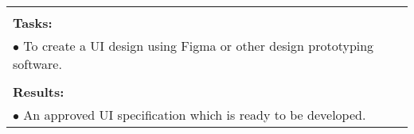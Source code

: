 \begin{table}[!h]
\begin{center}
\begin{tabular}{|p{}||p{}|p{}||p{}|}
            \multicolumn{4}{|p{.95\columnwidth}|}{}\\
            \multicolumn{4}{|p{.95\columnwidth}|}{\textbf{Tasks:}}\\
            \multicolumn{4}{|p{.95\columnwidth}|}{$\bullet$ To create a UI design using Figma or other design prototyping software.}\\
            \multicolumn{4}{|p{.95\columnwidth}|}{}\\
            \multicolumn{4}{|p{.95\columnwidth}|}{\textbf{Results:}}\\
            \multicolumn{4}{|p{.95\columnwidth}|}{$\bullet$ An approved UI specification which is ready to be developed.}\\
            
            \hline
        \end{tabular}
    \end{center}
\end{table}

\clearpage


